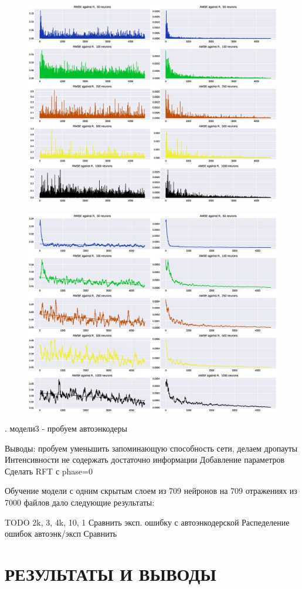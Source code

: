 \documentclass{article}
\begin{document}
\begin{figure}[htp]
\centering
\includegraphics[scale=0.50]{imgs/aenc-errdist.eps}
\caption{}
\label{}
\end{figure}


\begin{figure}[htp]
\centering
\includegraphics[scale=0.50]{imgs/aenc-errdist_fl.eps}
\caption{}
\label{}
\end{figure}


. модели3 - пробуем автоэнкодеры

Выводы:
пробуем уменьшить запоминающую способность сети, делаем дропауты
Интенсивности не содержать достаточно информации
Добавление параметров
Сделать RFT с phase=0
 
Обучение модели с одним скрытым слоем из 709 нейронов на 709 отражениях из 7000 файлов дало следующие результаты:

TODO 2k, 3, 4k, 10, 1
Сравнить эксп. ошибку с автоэнкодерской
Распеделение ошибок автоэнк/эксп
Сравнить 




\section{РЕЗУЛЬТАТЫ И ВЫВОДЫ}
\end{document}
